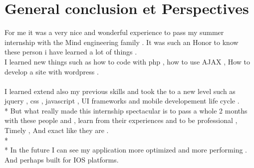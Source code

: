 \chapter*{General conclusion et Perspectives}

For me it was a very nice and wonderful experience to pass my summer internship with the Mind engineering family . It was such an Honor to know these person i have learned a lot of things . 
\\I learned new things such as how to code with php , how to use  AJAX , How to develop a site with wordpress 
.
\\ 
\\ I learned extend also my previous skills and took the to a new level such as jquery , css , javascript , UI frameworks  and mobile developement life cycle .
\\*
But what really made this internship spectacular is to pass a whole 2 months with these people and , learn from their experiences  and to be professional , Timely , And exact like they are .
\\*
\\*
In the future I can see my application more optimized and more performing . And perhaps built for IOS platforms.